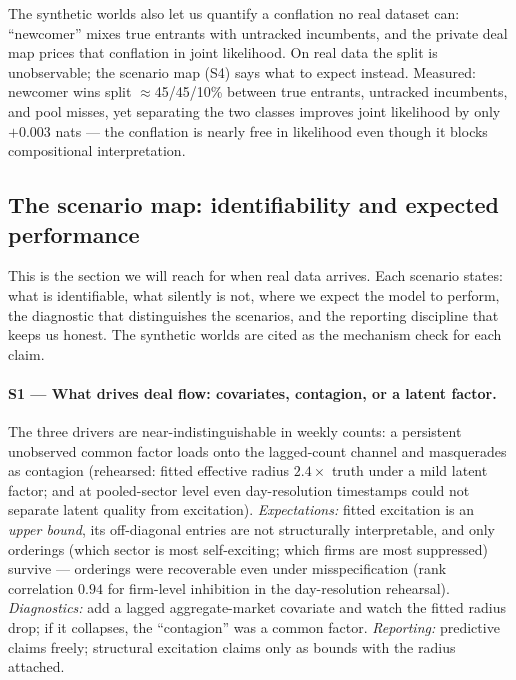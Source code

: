 The synthetic worlds also let us quantify a conflation no real dataset can:
``newcomer'' mixes true entrants with untracked incumbents, and the private
deal map prices that conflation in joint likelihood. On real data the split is
unobservable; the scenario map (S4) says what to expect instead.
Measured: newcomer wins split $\approx$45/45/10\% between true entrants,
untracked incumbents, and pool misses, yet separating the two classes improves
joint likelihood by only $+0.003$ nats --- the conflation is nearly free in
likelihood even though it blocks compositional interpretation.

\subsection{The scenario map: identifiability and expected performance}
\label{sec:design_scenarios}

This is the section we will reach for when real data arrives. Each scenario
states: what is identifiable, what silently is not, where we expect the model
to perform, the diagnostic that distinguishes the scenarios, and the reporting
discipline that keeps us honest. The synthetic worlds are cited as the
mechanism check for each claim.

\paragraph{S1 --- What drives deal flow: covariates, contagion, or a latent
factor.}
The three drivers are near-indistinguishable in weekly counts: a persistent
unobserved common factor loads onto the lagged-count channel and masquerades as
contagion (rehearsed: fitted effective radius $2.4\times$ truth under a mild
latent factor; and at pooled-sector level even day-resolution timestamps could
not separate latent quality from excitation). \emph{Expectations:} fitted
excitation is an \emph{upper bound}, its off-diagonal entries are not
structurally interpretable, and only orderings (which sector is most
self-exciting; which firms are most suppressed) survive --- orderings were
recoverable even under misspecification (rank correlation $0.94$ for
firm-level inhibition in the day-resolution rehearsal). \emph{Diagnostics:}
add a lagged aggregate-market covariate and watch the fitted radius drop; if it
collapses, the ``contagion'' was a common factor. \emph{Reporting:} predictive
claims freely; structural excitation claims only as bounds with the radius
attached.

